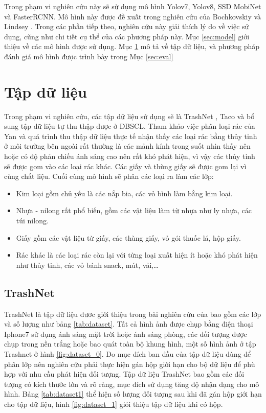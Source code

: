 \documentclass[../the.tex]{subfiles}
\begin{document}
Trong phạm vi nghiên cứu này sẽ sử dụng mô hình Yolov7, Yolov8, SSD MobiNet và FasterRCNN. Mô hình này được đề xuất trong nghiên cứu của Bochkovskiy \etal \cite{Bochkovskiy2020YOLOv4OS} và Lindsey \etal \cite{Lindsey1806905115}. Trong các phần tiếp theo, nghiên cứu này giải thích lý do về việc sử dụng, cũng như chi tiết cụ thể của các phương pháp này. Mục \ref{sec:model} giới thiệu về các mô hình được sử dụng. Mục \ref{sec:dataset} mô tả về tập dữ liệu, và phương pháp đánh giá mô hình được trình bày trong Mục \ref{sec:eval}

\section{Tập dữ liệu}
\label{sec:dataset}

{\fontsize{13}{12} \selectfont
Trong phạm vi nghiên cứu, các tập dữ liệu sử dụng sẽ là TrashNet \cite{yang2016classification}, Taco \cite{proença2020taco} và bổ sung tập dữ liệu tự thu thập được ở ĐBSCL.
Tham khảo việc phân loại rác của Yan \cite{yang2016classification} và quá trình thu thập dữ liệu thực tế nhận thấy các loại rác bằng thủy tinh ở môi trường bên ngoài rất thường là các mảnh kính trong suốt nhìn thấy nên hoặc có độ phản chiếu ánh sáng cao nên rất khó phát hiện, vì vậy các thủy tinh sẽ được gom vào các loại rác khác.
Các giấy và thùng giấy sẽ được gom lại vì cùng chất liệu. Cuối cùng mô hình sẽ phân các loại ra làm các lớp:
\begin{itemize}
	\item Kim loại gồm chủ yếu là các nắp bia, các vỏ bình làm bằng kim loại.
	\item Nhựa - nilong rất phổ biến, gồm các vật liệu làm từ nhựa như ly nhựa, các túi nilong.
	\item Giấy gồm các vật liệu từ giấy, các thùng giấy, vỏ gói thuốc lá, hộp giấy.
	\item Rác khác là các loại rác còn lại với từng loại xuất hiện ít hoặc khó phát hiện như thủy tinh, các vỏ bánh snack,
	mút, vải,\dots
\end{itemize}

\subsection{TrashNet}
{\fontsize{13}{12} \selectfont 
TrashNet là tập dữ liệu đươc giới thiệu trong bài nghiên cứu của \cite{yang2016classification} bao gồm các lớp và số lượng như bảng \ref{tab:dataset}. Tất cả hình ảnh được chụp bằng điện thoại Iphone7 sử dụng ánh sáng mặt trời hoặc ánh sáng phòng, các đối tượng được chụp trong nền trắng hoặc bao quát toàn bộ khung hình, một số hình ảnh ở tập Trashnet ở hình 
\ref{fig:dataset_0}.
Do mục đích ban đầu của tập dữ liệu dùng để phân lớp nên nghiên cứu phải thực hiện gán hộp giới hạn cho bộ dữ liệu để phù hợp với nhu cầu phát hiện đối tượng. Tập dữ liệu TrashNet bao gồm các đối tượng có kích thước lớn và rõ ràng, mục đích sử dụng tăng độ nhận dạng cho mô hình. Bảng \ref{tab:dataset1} thể hiện số lượng đối tượng sau khi đã gán hộp giới hạn cho tập dữ liệu, hình 
\ref{fig:dataset_1} giói thiệu tập dữ liệu khi có hộp.
}
}
\end{document}
